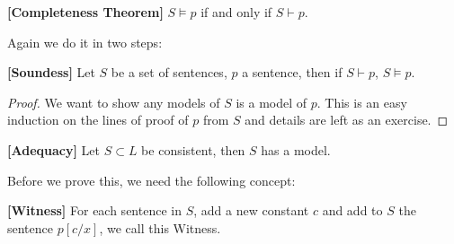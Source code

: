 \begin{theorem}{\bf [Completeness Theorem]} $S \models p$ if and only if $S \vdash p$.
\end{theorem}
Again we do it in two steps:
\begin{proposition}{\bf [Soundess]} Let $S$ be a set of sentences, $p$ a sentence, then if $S \vdash p$, $S \models p$.
\end{proposition}
\begin{proof} We want to show any models of $S$ is a model of $p$. This is an easy induction on the lines of proof of $p$ from $S$ and details are left as an exercise.
\end{proof}
\begin{theorem}{\bf [Adequacy]} Let $S \subset L$ be consistent, then $S$ has a model.
\end{theorem}
Before we prove this, we need the following concept:
\begin{definition}{\bf [Witness]} For each sentence in $S$, add a new constant $c$ and add to $S$ the sentence $p[c/x]$, we call this Witness.
\end{definition}
